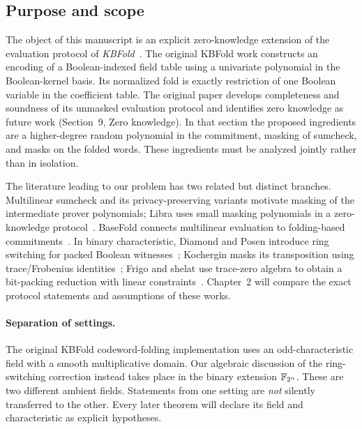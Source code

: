 \subsection{Purpose and scope}\label{sec:intro:purpose}

The object of this manuscript is an explicit zero-knowledge extension of the evaluation protocol of \emph{KBFold}~\cite{MkhidaKBFold2026}. The original KBFold work constructs an encoding of a Boolean-indexed field table using a univariate polynomial in the Boolean-kernel basis. Its normalized fold is exactly restriction of one Boolean variable in the coefficient table. The original paper develops completeness and soundness of its unmasked evaluation protocol and identifies zero knowledge as future work (Section~9, Zero knowledge). In that section the proposed ingredients are a higher-degree random polynomial in the commitment, masking of sumcheck, and masks on the folded words. These ingredients must be analyzed jointly rather than in isolation.

The literature leading to our problem has two related but distinct branches. Multilinear sumcheck and its privacy-preserving variants motivate masking of the intermediate prover polynomials; Libra uses small masking polynomials in a zero-knowledge protocol~\cite{XieEtAl2019Libra}. BaseFold connects multilinear evaluation to folding-based commitments~\cite{ZeilbergerChenFischBaseFold}. In binary characteristic, Diamond and Posen introduce ring switching for packed Boolean witnesses~\cite{DiamondPosen2024}; Kochergin masks its transposition using trace/Frobenius identities~\cite{Kochergin2026}; Frigo and shelat use trace-zero algebra to obtain a bit-packing reduction with linear constraints~\cite{FrigoShelat2026}. Chapter~2 will compare the exact protocol statements and assumptions of these works.

\paragraph{Separation of settings.} The original KBFold codeword-folding implementation uses an odd-characteristic field with a smooth multiplicative domain. Our algebraic discussion of the ring-switching correction instead takes place in the binary extension $\mathbb{F}_{2^n}$. These are two different ambient fields. Statements from one setting are \emph{not} silently transferred to the other. Every later theorem will declare its field and characteristic as explicit hypotheses.
